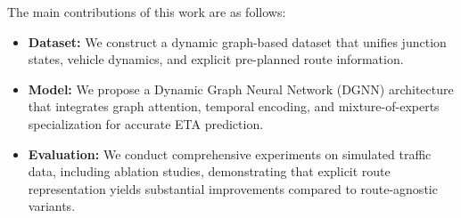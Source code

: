The main contributions of this work are as follows:
\begin{itemize}
    \item \textbf{Dataset:} We construct a dynamic graph-based dataset that unifies junction states, vehicle dynamics, and explicit pre-planned route information. 
    \item \textbf{Model:} We propose a Dynamic Graph Neural Network (DGNN) architecture that integrates graph attention, temporal encoding, and mixture-of-experts specialization for accurate ETA prediction. 
    \item \textbf{Evaluation:} We conduct comprehensive experiments on simulated traffic data, including ablation studies, demonstrating that explicit route representation yields substantial improvements compared to route-agnostic variants. 
\end{itemize}
